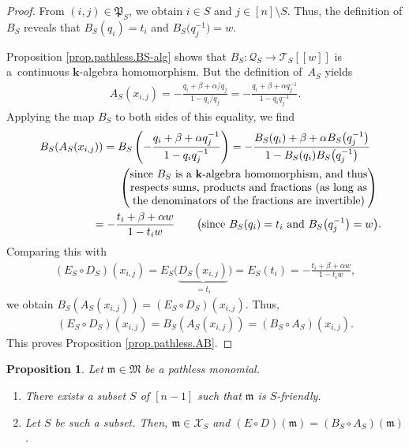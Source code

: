 \documentclass[pdftex]{sigma}
\newtheorem{Proposition}[Theorem]{Proposition}
\numberwithin{equation}{section}
\begin{document}
\begin{proof}From $(i,j) \in\mathfrak{P}_{S}$, we obtain $i\in S$ and $j\in[n] \setminus S$. Thus, the definition of $B_{S}$ reveals that $B_{S} ( q_{i} ) =t_{i}$ and $B_{S}\big( q_{j}^{-1}\big) =w$.

Proposition \ref{prop.pathless.BS-alg} shows that $B_{S}\colon \mathcal{Q}_{S}\rightarrow\mathcal{T}_{S}[[w]] $ is a~continuous $\mathbf{k}$-algebra homomorphism. But the definition of~$A_{S}$ yields
\begin{gather*}
A_{S}(x_{i,j}) =-\frac{q_{i}+\beta+\alpha/q_{j}}{1-q_{i}/q_{j}}=-\frac{q_{i}+\beta+\alpha q_{j}^{-1}}{1-q_{i}q_{j}^{-1}}.
\end{gather*}
Applying the map $B_{S}$ to both sides of this equality, we find
\begin{gather*}
B_{S} ( A_{S}(x_{i,j}) ) =B_{S}\left( -\frac{q_{i}+\beta+\alpha q_{j}^{-1}}{1-q_{i}q_{j}^{-1}}\right)=-\frac{B_{S} ( q_{i} ) +\beta+\alpha B_{S} \big( q_{j}
^{-1}\big) }{1-B_{S}(q_{i}) B_{S}\big( q_{j}^{-1}\big)}\\
\hphantom{B_{S} ( A_{S}(x_{i,j}) )}{} \qquad \left(
\begin{matrix}
\text{since }B_{S}\text{ is a }\mathbf{k}\text{-algebra homomorphism, and
thus}\\
\text{respects sums, products and fractions (as long as}\\
\text{the denominators of the fractions are invertible)}%
\end{matrix}
\right) \\
\hphantom{B_{S} ( A_{S}(x_{i,j}) )}{} =-\frac{t_{i}+\beta+\alpha w}{1-t_{i}w}\qquad \big(\text{since }B_{S}(q_{i}) =t_{i}\text{ and }B_{S}\big(q_{j}^{-1}\big) =w\big) .
\end{gather*}
Comparing this with
\begin{gather*}
( E_{S}\circ D_{S}) (x_{i,j}) =E_{S}\Big(\underbrace{D_{S}(x_{i,j}) }_{=t_{i}}\Big) =E_{S} (t_{i}) =-\frac{t_{i}+\beta+\alpha w}{1-t_{i}w},
\end{gather*}
we obtain $B_{S} ( A_{S}(x_{i,j}) ) = ( E_{S}\circ D_{S}) (x_{i,j}) $. Thus,
\begin{gather*}
( E_{S}\circ D_{S} ) (x_{i,j}) =B_{S} ( A_{S} ( x_{i,j} ) ) = ( B_{S}\circ A_{S} ) (x_{i,j} ) .
\end{gather*}
This proves Proposition \ref{prop.pathless.AB}.
\end{proof}

\begin{Proposition}\label{prop.pathless.S}Let $\mathfrak{m}\in\mathfrak{M}$ be a pathless monomial.
\begin{enumerate}\itemsep=0pt
\item[{\rm (a)}] There exists a subset $S$ of $[n-1] $ such that $\mathfrak{m}$ is $S$-friendly.
\item[{\rm (b)}] Let $S$ be such a subset. Then, $\mathfrak{m}\in\mathcal{X}_{S}$ and $(E\circ D) (\mathfrak{m}) = ( B_{S}\circ A_{S}) (\mathfrak{m}) $.
\end{enumerate}
\end{Proposition}
\end{document}
